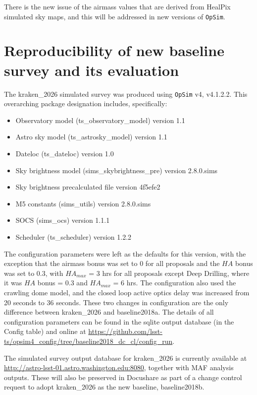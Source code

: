 \documentclass[DM,authoryear,toc]{lsstdoc}
\newcommand{\opsim}{\texttt{OpSim}\xspace}
\begin{document}
There is the new issue of the airmass values that are derived from HealPix simulated sky maps, and this will be addressed
in new versions of \opsim.

\section{Reproducibility of new baseline survey and its evaluation}

The kraken\_2026  simulated survey was produced using \opsim v4, v4.1.2.2.  This overarching package designation includes, specifically:
\begin{itemize}
\item Observatory model (ts\_observatory\_model) version 1.1
\item Astro sky model (ts\_astrosky\_model) version 1.1
\item Dateloc (ts\_dateloc) version 1.0
\item Sky brightness model (sims\_skybrightness\_pre) version 2.8.0.sims
\item Sky brightness precalculated file version 4f5efe2
\item M5 constants (sims\_utils) version 2.8.0.sims
\item SOCS (sims\_ocs) version 1.1.1
\item Scheduler (ts\_scheduler) version 1.2.2
\end{itemize}

The configuration parameters were left as the defaults for this version, with the exception that the airmass bonus was set to 0 for all proposals and the $HA$ bonus was set to 0.3, with $HA_{max}$ = 3 hrs
for all proposals except Deep Drilling, where it was $HA$ bonus = 0.3 and $HA_{max}$ = 6 hrs. The configuration also used the
crawling dome model, and the closed loop active optics delay was increased from 20 seconds to 36 seconds.
These two changes in configuration are the only difference between kraken\_2026 and baseline2018a.
The details of all configuration parameters can be found in the sqlite output database (in the Config table) and online at 
\url{https://github.com/lsst-ts/opsim4_config/tree/baseline2018_dc_cl/config_run}.

The simulated survey output database for kraken\_2026 is currently available at \url{http://astro-lsst-01.astro.washington.edu:8080}, 
together with MAF analysis outputs. These will also be preserved in Docushare as part of a change control request to adopt
kraken\_2026 as the new baseline, baseline2018b.
\end{document}
